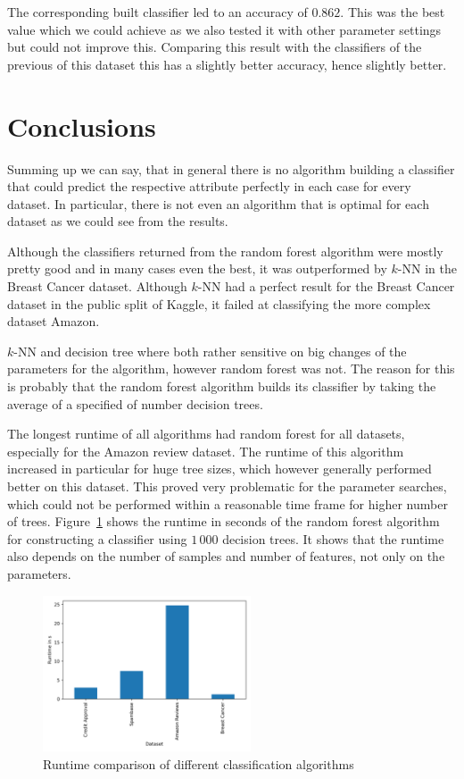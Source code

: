 \documentclass[a4paper,11pt]{article}
\begin{document}
        The corresponding built classifier led to an accuracy of $0.862$. This was the best value which we could achieve as we also tested it with other parameter settings but could not improve this. Comparing this result with the classifiers of the previous of this dataset this has a slightly better accuracy, hence slightly better.
        

\section{Conclusions}
    Summing up we can say, that in general there is no algorithm building a classifier that could predict the respective attribute perfectly in each case for every dataset. In particular, there is not even an algorithm that is optimal for each dataset as we could see from the results.
    
    Although the classifiers returned from the random forest algorithm were mostly pretty good and in many cases even the best, it was outperformed by $k$-NN in the Breast Cancer dataset. Although $k$-NN had a perfect result for the Breast Cancer dataset in the public split of Kaggle, it failed at classifying the more complex dataset Amazon.
    
    $k$-NN and decision tree where both rather sensitive on big changes of the parameters for the algorithm, however random forest was not. The reason for this is probably that the random forest algorithm builds its classifier by taking the average of a specified of number decision trees.
    
    The longest runtime of all algorithms had random forest for all datasets, especially for the Amazon review dataset. The runtime of this algorithm increased in particular for huge tree sizes, which however generally performed better on this dataset. This proved very problematic for the parameter searches, which could not be performed within a reasonable time frame for higher number of trees. Figure~\ref{fig:runtime-comparison} shows the runtime in seconds of the random forest algorithm for constructing a classifier using $1\,000$ decision trees. It shows that the runtime also depends on the number of samples and number of features, not only on the parameters.
    
    \begin{figure}[h!]
            \centering
            \includegraphics[width=0.55\textwidth]{exercise_1/paper/figures/runtime_comparison.png}
            \caption{Runtime comparison of different classification algorithms}
            \label{fig:runtime-comparison}
    \end{figure}
\end{document}
